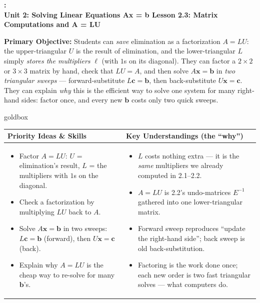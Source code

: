 \documentclass[10pt]{article}
\newcommand{\xx}{\mathbf{x}}
\newcommand{\bb}{\mathbf{b}}
\newcommand{\cc}{\mathbf{c}}
\newcommand{\UnitNumberName}{Unit 2: Solving Linear Equations Ax = b \quad}
\newcommand{\LessonNumberName}{Lesson 2.3: Matrix Computations and A = LU}
\begin{document}
\begin{center}
    {\Large\bfseries \CourseName: \SchoolYear \\
    {\small\bfseries \UnitNumberName \LessonNumberName}}
\end{center}

\begin{tcolorbox}[colback=blush, colframe=burgundy, boxrule=0.9pt, arc=2mm,
    left=2mm, right=2mm, top=1.5mm, bottom=1.5mm]
    \textbf{Primary Objective:} Students can \emph{save} elimination as a factorization
    $A=LU$: the upper-triangular $U$ is the result of elimination, and the lower-triangular $L$
    simply \emph{stores the multipliers} $\ell$ (with $1$s on its diagonal). They can factor a
    $2\times2$ or $3\times3$ matrix by hand, check that $LU=A$, and then solve $A\xx=\bb$ in
    \emph{two triangular sweeps} --- forward-substitute $L\cc=\bb$, then back-substitute
    $U\xx=\cc$. They can explain \emph{why} this is the efficient way to solve one system for many
    right-hand sides: factor once, and every new $\bb$ costs only two quick sweeps.
\end{tcolorbox}

\renewcommand{\arraystretch}{1.4}
\begin{skillbox}{goldbox}
\begin{tabularx}{\linewidth}{@{}X|X@{}}
\textbf{Priority Ideas \& Skills} & \textbf{Key Understandings (the ``why'')} \\[2pt]
\hline
\vspace{-6pt}
\begin{itemize}[leftmargin=1.1em, nosep, after=\vspace{2pt}]
  \item Factor $A=LU$: $U$ = elimination's result, $L$ = the multipliers with $1$s on the diagonal.
  \item Check a factorization by multiplying $LU$ back to $A$.
  \item Solve $A\xx=\bb$ in two sweeps: $L\cc=\bb$ (forward), then $U\xx=\cc$ (back).
  \item Explain why $A=LU$ is the cheap way to re-solve for many $\bb$'s.
\end{itemize}
&
\vspace{-6pt}
\begin{itemize}[leftmargin=1.1em, nosep, after=\vspace{2pt}]
  \item $L$ costs nothing extra --- it is the \emph{same} multipliers we already computed in 2.1--2.2.
  \item $A=LU$ is 2.2's undo-matrices $E^{-1}$ gathered into one lower-triangular matrix.
  \item Forward sweep reproduces ``update the right-hand side''; back sweep is old back-substitution.
  \item Factoring is the work done once; each new order is two fast triangular solves --- what computers do.
\end{itemize}
\end{tabularx}
\end{skillbox}
\end{document}
